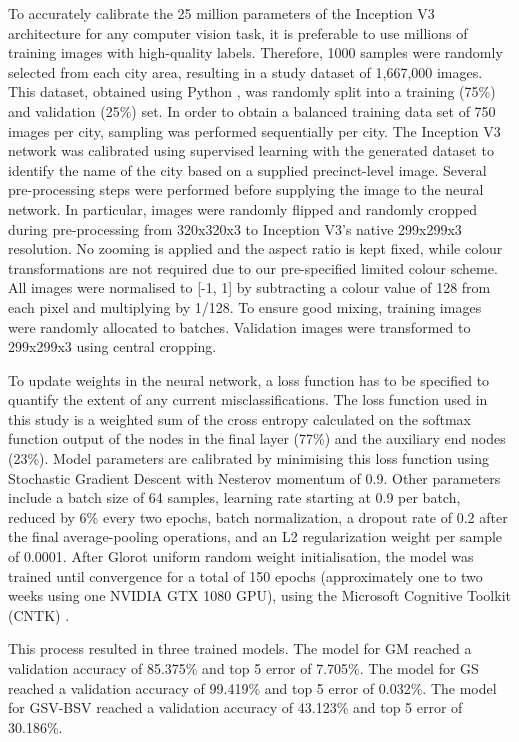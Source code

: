 \documentclass[final,3p,times,authoryear]{elsarticle}
\begin{document}
To accurately calibrate the 25 million parameters of the Inception V3 architecture for any computer vision task, it is preferable to use millions of training images with high-quality labels. Therefore, 1000 samples were randomly selected from each city area, resulting in a study dataset of 1,667,000 images. This dataset, obtained using Python \citep{Python2016}, was randomly split into a training (75\%) and validation (25\%) set. In order to obtain a balanced training data set of 750 images per city, sampling was performed sequentially per city.
The Inception V3 network was calibrated using supervised learning with the generated dataset to identify the name of the city based on a supplied precinct-level image. Several pre-processing steps were performed before supplying the image to the neural network. In particular, images were randomly flipped and randomly cropped during pre-processing from 320x320x3 to Inception V3's native 299x299x3 resolution. No zooming is applied and the aspect ratio is kept fixed, while colour transformations are not required due to our pre-specified limited colour scheme. All images were normalised to [-1, 1] by subtracting a colour value of 128 from each pixel and multiplying by 1/128. To ensure good mixing, training images were randomly allocated to batches. Validation images were transformed to 299x299x3 using central cropping.

To update weights in the neural network, a loss function has to be specified to quantify the extent of any current misclassifications. The loss function used in this study is a weighted sum of the cross entropy calculated on the softmax function output of the nodes in the final layer (77\%) and the auxiliary end nodes (23\%). Model parameters are calibrated by minimising this loss function using Stochastic Gradient Descent with Nesterov momentum of 0.9. Other parameters include a batch size of 64 samples, learning rate starting at 0.9 per batch, reduced by 6\% every two epochs, batch normalization, a dropout rate of 0.2 after the final average-pooling operations, and an L2 regularization weight per sample of 0.0001. After Glorot uniform random weight initialisation, the model was trained until convergence for a total of 150 epochs (approximately one to two weeks using one NVIDIA GTX 1080 GPU), using the Microsoft Cognitive Toolkit (CNTK) \citep{Yu2015}. 

This process resulted in three trained models. The model for GM reached a validation accuracy of 85.375\% and top 5 error of 7.705\%. The model for GS reached a validation accuracy of 99.419\% and top 5 error of 0.032\%. The model for GSV-BSV reached a validation accuracy of 43.123\% and top 5 error of 30.186\%.
\end{document}
